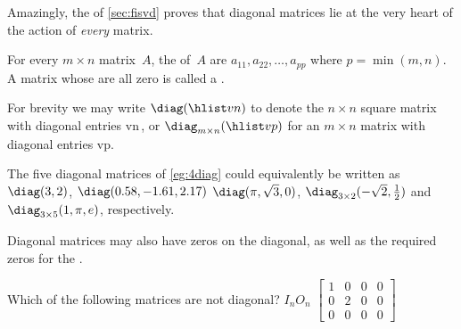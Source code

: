 Amazingly, the  of \autoref{sec:fisvd} proves that diagonal matrices lie at the very heart of the action of \emph{every} matrix.

\begin{definition} \label{def:diag} 
For every \(m\times n\) matrix~\(A\), the  of~\(A\) are \(a_{11},a_{22},\ldots,a_{pp}\) where \(p=\min(m,n)\).
A matrix whose  are all zero is called a .

For brevity we may write \(\diag(\hlist vn)\) to denote the \(n\times n\) square matrix with diagonal entries \hlist vn\,, or \(\diag_{m\times n}(\hlist vp)\) for an \(m\times n\) matrix with diagonal entries \hlist vp.
\end{definition}

\begin{example} \label{eg:} \sloppy
The five diagonal matrices of \autoref{eg:4diag} could equivalently be written as \(\diag(3,2)\), \(\diag(0.58,-1.61,2.17)\) \(\diag(\pi,\sqrt3,0)\), \(\diag_{3\times2}(-\sqrt2,\tfrac12)\) and \(\diag_{3\times5}(1,\pi,e)\), respectively.
\end{example}


Diagonal matrices may also have zeros on the diagonal, as well as the 
required zeros for the .


\begin{activity}
Which of the following matrices are not diagonal?
{\(I_n\)}{\(O_n\)}
{\(\begin{bmatrix} 1&0&0&0
\\0&2&0&0
\\0&0&0&0 \end{bmatrix}\)}
\end{activity}
  


